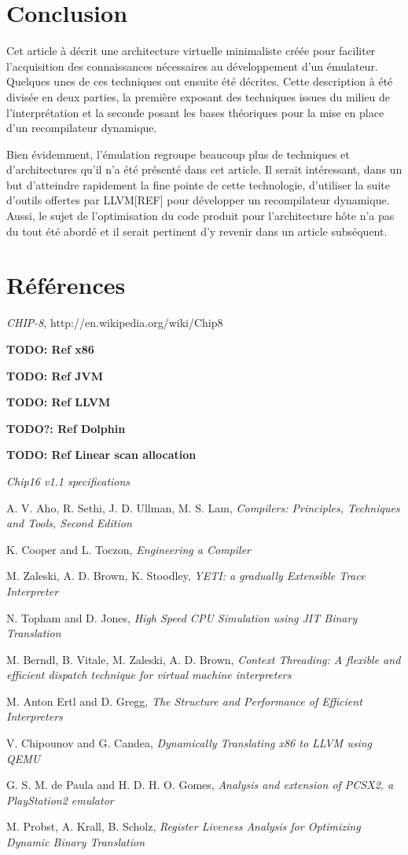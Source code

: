 \documentclass{article} %
\begin{document}
\section{Conclusion}
Cet article à décrit une architecture virtuelle minimaliste créée pour faciliter l'acquisition des connaissances nécessaires au développement d'un émulateur. Quelques unes de ces techniques ont ensuite été décrites. Cette description à été divisée en deux parties, la première exposant des techniques issues du milieu de l'interprétation et la seconde posant les bases théoriques pour la mise en place d'un recompilateur dynamique.

Bien évidemment, l'émulation regroupe beaucoup plus de techniques et d'architectures qu'il n'a été présenté dans cet article. Il serait intéressant, dans un but d'atteindre rapidement la fine pointe de cette technologie, d'utiliser la suite d'outils offertes par LLVM[REF] pour développer un recompilateur dynamique. Aussi, le sujet de l'optimisation du code produit pour l'architecture hôte n'a pas du tout été abordé et il serait pertinent d'y revenir dans un article subséquent.

\section{Références}
\small{
\textit{CHIP-8}, http://en.wikipedia.org/wiki/Chip8

\textbf{TODO: Ref x86}

\textbf{TODO: Ref JVM}

\textbf{TODO: Ref LLVM}

\textbf{TODO?: Ref Dolphin}

\textbf{TODO: Ref Linear scan allocation}

\textit{Chip16 v1.1 specifications}

A. V. Aho, R. Sethi, J. D. Ullman, M. S. Lam, \textit{Compilers: Principles, Techniques and Tools, Second Edition}

K. Cooper and L. Toczon, \textit{Engineering a Compiler}

M. Zaleski, A. D. Brown, K. Stoodley, \textit{YETI: a gradually Extensible Trace Interpreter}

N. Topham and D. Jones, \textit{High Speed CPU Simulation using JIT Binary Translation}

M. Berndl, B. Vitale, M. Zaleski, A. D. Brown, \textit{Context Threading: A flexible and efficient dispatch technique for virtual machine interpreters}

M. Anton Ertl and D. Gregg, \textit{The Structure and Performance of Efficient Interpreters}

V. Chipounov and G. Candea, \textit{Dynamically Translating x86 to LLVM using QEMU}

G. S. M. de Paula and H. D. H. O. Gomes, \textit{Analysis and extension of PCSX2, a PlayStation2 emulator}

M. Probst, A. Krall, B. Scholz, \textit{Register Liveness Analysis for Optimizing Dynamic Binary Translation}
}
\end{document}
